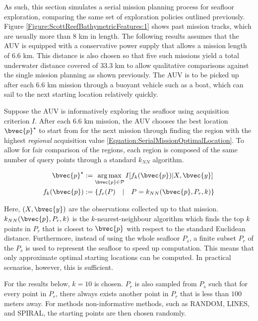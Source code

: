 			As such, this section simulates a serial mission planning process for seafloor exploration, comparing the same set of exploration policies outlined previously. Figure \ref{Figure:ScottReefBathymetricFeatures:1} shows past mission tracks, which are usually more than 8 km in length. The following results assumes that the AUV is equipped with a conservative power supply that allows a mission length of 6.6 km. This distance is also chosen so that five such missions yield a total underwater distance covered of 33.3 km to allow qualitative comparisons against the single mission planning as shown previously. The AUV is to be picked up after each 6.6 km mission through a buoyant vehicle such as a boat, which can sail to the next starting location relatively quickly.
			
			Suppose the AUV is informatively exploring the seafloor using acquisition criterion $I$. After each 6.6 km mission, the AUV chooses the best location $\bvec{p}^{\star}$ to start from for the next mission through finding the region with the highest \textit{regional} acquisition value \eqref{Equation:SerialMissionOptimalLocation}. To allow for fair comparison of the regions, each region is composed of the same number of query points through a standard $k_{NN}$ algorithm.
			
			\begin{equation}
				\begin{aligned}
					\bvec{p}^{\star} &:= \argmax_{\bvec{p} \in \mathcal{P}} I[f_{k}(\bvec{p}) | X, \bvec{y}] \\
					f_{k}(\bvec{p}) &:= \{f_{e}(P) \quad | \quad P = k_{NN}(\bvec{p}, P_{r}, k) \}
				\end{aligned}
			\label{Equation:SerialMissionOptimalLocation}
			\end{equation}
			
			Here, $(X, \bvec{y})$ are the observations collected up to that mission. $k_{NN}(\bvec{p}, P_{r}, k)$ is the $k$-nearest-neighbour algorithm which finds the top $k$ points in $P_{r}$ that is closest to $\bvec{p}$ with respect to the standard Euclidean distance. Furthermore, instead of using the whole seafloor $P_{s}$, a finite subset $P_{r}$ of the $P_{s}$ is used to represent the seafloor to speed up computation. This means that only approximate optimal starting locations can be computed. In practical scenarios, however, this is sufficient.
			
			For the results below, $k = 10$ is chosen. $P_{r}$ is also sampled from $P_{s}$ such that for every point in $P_{r}$, there always exists another point in $P_{r}$ that is less than $100$ meters away. For methods non-informative methods, such as RANDOM, LINES, and SPIRAL, the starting points are then chosen randomly. 
			
